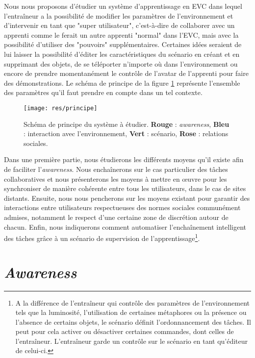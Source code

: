 \documentclass[11pt]{article}
\begin{document}
Nous nous proposons d'étudier un système d'apprentissage en EVC dans lequel l'entraîneur a la possibilité de modifier les paramètres de l'environnement et d'intervenir en tant que "super utilisateur", c'est-à-dire de collaborer avec un apprenti comme le ferait un autre apprenti "normal" dans l'EVC, mais avec la possibilité d'utiliser des "pouvoirs" supplémentaires. Certaines idées seraient de lui laisser la possibilité d'éditer les caractéristiques du scénario en créant et en supprimant des objets, de se téléporter n'importe où dans l'environnement ou encore de prendre momentanément le contrôle de l'avatar de l'apprenti pour faire des démonstrations. Le schéma de principe de la figure \ref{fig:principle} représente l'ensemble des paramètres qu'il faut prendre en compte dans un tel contexte.
\\

\begin{figure}[!h]
\centering
\texttt{[image: res/principe]}
\caption{\label{fig:principle}Schéma de principe du système à étudier. \textbf{Rouge} : \textit{awareness}, \textbf{Bleu} : interaction avec l'environnement, \textbf{Vert} : scénario, \textbf{Rose} : relations sociales.}
\end{figure}

Dans une première partie, nous étudierons les différents moyens qu'il existe afin de faciliter l'\textit{awareness}. Nous enchaînerons sur le cas particulier des tâches collaboratives et nous présenterons les moyens à mettre en œuvre pour les synchroniser de manière cohérente entre tous les utilisateurs, dans le cas de sites distants. Ensuite, nous nous pencherons sur les moyens existant pour garantir des interactions entre utilisateurs respectueuses des normes sociales communément admises, notamment le respect d'une certaine zone de discrétion autour de chacun. Enfin, nous indiquerons comment automatiser l'enchaînement intelligent des tâches grâce à un scénario de supervision de l'apprentissage\footnote{A la différence de l'entraîneur qui contrôle des paramètres de l'environnement tels que la luminosité, l'utilisation de certaines métaphores ou la présence ou l'absence de certains objets, le scénario définit l'ordonnancement des tâches. Il peut pour cela activer ou désactiver certaines commandes, dont celles de l'entraîneur. L'entraîneur garde un contrôle sur le scénario en tant qu'éditeur de celui-ci.}.

\section{\textit{Awareness}}
\end{document}
